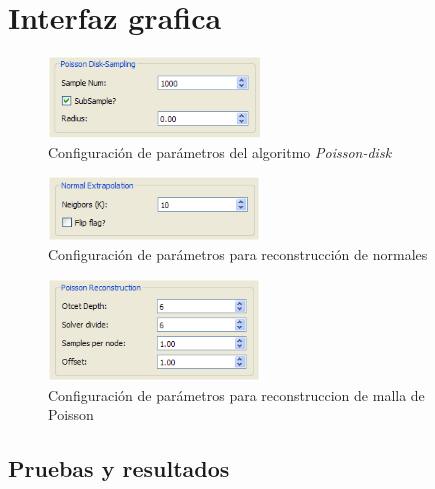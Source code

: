 \section{Interfaz grafica}

\begin{figure}[H]
  \centering
    \includegraphics[width=0.5\textwidth]{./Cap2_videomapping/malla-poissongui.png}
  \caption{Configuración de parámetros del algoritmo \emph{Poisson-disk}}
  \label{fig:Mesh-PoissonGui}
\end{figure}

\begin{figure}[H]
  \centering
    \includegraphics[width=0.5\textwidth]{./Cap2_videomapping/malla-normalextrapolation.png}
  \caption{Configuración de parámetros para reconstrucción de normales}
  \label{fig:Mesh-Extrapolation}
\end{figure}

\begin{figure}[H]
  \centering
    \includegraphics[width=0.5\textwidth]{./Cap2_videomapping/malla-poissonreconstruction.png}
  \caption{Configuración de parámetros para reconstruccion de malla de Poisson}
  \label{fig:Mesh-Normals}
\end{figure}


\subsection{Pruebas y resultados}


